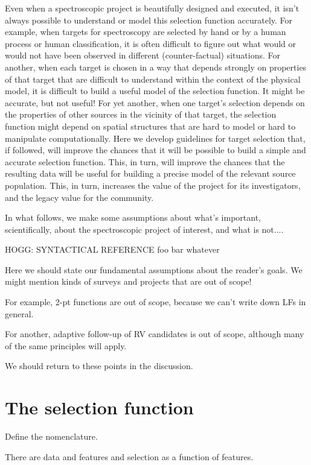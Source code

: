 \documentclass[modern]{aastex62}
\begin{document}
Even when a spectroscopic project is beautifully designed and
executed, it isn't always possible to understand or model this
selection function accurately.
For example, when targets for spectroscopy are selected by hand or by
a human process or human classification, it is often difficult to
figure out what would or would not have been observed in different
(counter-factual) situations.
For another, when each target is chosen in a way that depends strongly
on properties of that target that are difficult to understand within
the context of the physical model, it is difficult to build a useful
model of the selection function.
It might be accurate, but not useful!
For yet another, when one target's selection depends on the properties
of other sources in the vicinity of that target, the selection
function might depend on spatial structures that are hard to model or
hard to manipulate computationally.
Here we develop guidelines for target selection that, if followed,
will improve the chances that it will be possible to build a simple
and accurate selection function.
This, in turn, will improve the chances that the resulting data
will be useful for building a precise model of the relevant source
population.
This, in turn, increases the value of the project for its investigators,
and the legacy value for the community.

In what follows, we make some assumptions about what's important,
scientifically, about the spectroscopic project of interest, and what
is not....

HOGG: SYNTACTICAL REFERENCE foo bar whatever

Here we should state our fundamental assumptions about the reader's goals.
We might mention kinds of surveys and projects that are out of scope!

For example, 2-pt functions are out of scope, because we can't write
down LFs in general.

For another, adaptive follow-up of RV candidates is out of scope, although
many of the same principles will apply.

We should return to these points in the discussion.

\section{The selection function}

Define the nomenclature.

There are data and features and selection as a function of features.
\end{document}
